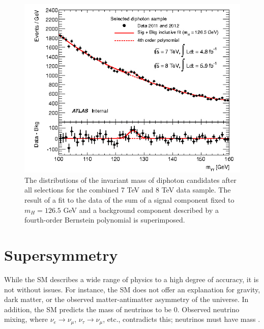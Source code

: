 		\begin{figure}[!ht]
		\centering
		\includegraphics[width=.7\textwidth,keepaspectratio=true]{chapters/chapter2_theory/images/Higgs_Discovery_gam_gam.jpeg}
		\caption{The distributions of the invariant mass of diphoton candidates after all selections for the combined 7 TeV and 8 TeV data sample. The result of a fit to the data of the sum of a signal component fixed to $m_H=126.5$ GeV  and a background component described by a fourth-order Bernstein polynomial is superimposed. \cite{higgs-discovery-atlas}}
		\label{fig:higgs-discovery}
		\end{figure}

\section{Supersymmetry}\label{sec:SUSY}
	While the \gls{SM} describes a wide range of physics to a high degree of accuracy, it is not without issues. For instance, the \gls{SM} does not offer an explanation for gravity, dark matter, or the observed matter-antimatter asymmetry of the universe. In addition, the \gls{SM} predicts the mass of neutrinos to be 0. Observed neutrino mixing, where $\nu_e \to \nu_\mu$, $\nu_\tau \to \nu_\mu$, etc., contradicts this; neutrinos must have mass \cite{pdg}.

